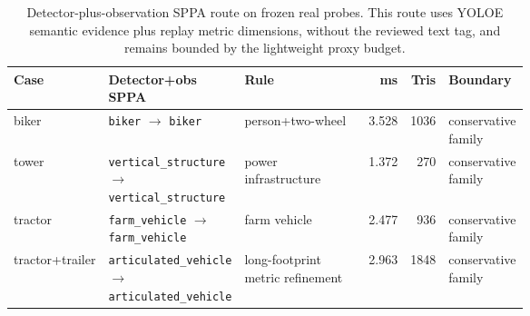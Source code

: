 \begin{table}[H]
\centering
\footnotesize
\setlength{\tabcolsep}{3pt}
\renewcommand{\arraystretch}{1.08}
\caption{Detector-plus-observation SPPA route on frozen real probes. This route uses YOLOE semantic evidence plus replay metric dimensions, without the reviewed text tag, and remains bounded by the lightweight proxy budget.}
\label{tab:sppa-detector-observation-refinement}
\begin{tabularx}{\linewidth}{@{}L{0.16\linewidth}L{0.22\linewidth}L{0.28\linewidth}r r Y@{}}
\toprule
Case & Detector+obs SPPA & Rule & ms & Tris & Boundary \\
\midrule
biker & \texttt{biker} $\rightarrow$ \texttt{biker} & person+two-wheel & 3.528 & 1036 & conservative family \\
tower & \texttt{vertical\_structure} $\rightarrow$ \texttt{vertical\_structure} & power infrastructure & 1.372 & 270 & conservative family \\
tractor & \texttt{farm\_vehicle} $\rightarrow$ \texttt{farm\_vehicle} & farm vehicle & 2.477 & 936 & conservative family \\
tractor+trailer & \texttt{articulated\_vehicle} $\rightarrow$ \texttt{articulated\_vehicle} & long-footprint metric refinement & 2.963 & 1848 & conservative family \\
\bottomrule
\end{tabularx}
\end{table}
